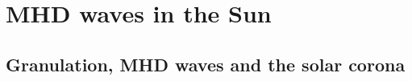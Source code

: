 \documentclass[../main.tex]{subfiles}
\begin{document}
\chapter{MHD waves in the Sun}
\PartialToc

\section{Granulation, MHD waves and the solar corona}
\cite{alf47granulation}


\stopcontents[chapters]
\end{document}

